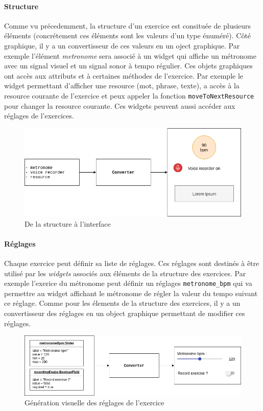 \paragraph{Structure}
Comme vu précedemment, la structure d'un exercice est consituée de plusieurs éléments (concrétement ces éléments sont les valeurs d'un type énuméré). Côté graphique, il y a un convertisseur de ces valeurs en un oject graphique. Par exemple l'élément \textit{metronome} sera associé à un widget qui affiche un métronome avec un signal visuel et un signal sonor à tempo régulier. Ces objets graphiques ont accès aux attributs et à certaines méthodes de l'exercice. Par exemple le widget permettant d'afficher une resource (mot, phrase, texte), a accès à la resource courante de l'exercice et peux appeler la fonction \texttt{moveToNextResource} pour changer la resource courante. Ces widgets peuvent aussi accéder aux réglages de l'exercices.

\begin{figure}[H]
  \includegraphics[width=0.8\linewidth]{content/imgs/struc.png}
  \caption{De la structure à l'interface}
  \label{fig:struc}
\end{figure}

\paragraph{Réglages}
Chaque exercice peut définir sa liste de réglages. Ces réglages sont destinés à être utilisé par les \textit{widgets} associés aux éléments de la structure des exercices. Par exemple l'exerice du métronome peut définir un réglages \texttt{metronome\_bpm} qui va permettre au widget affichant le métronome de régler la valeur du tempo suivant ce réglage. Comme pour les élements de la structure des exercices, il y a un convertisseur des réglages en un object graphique permettant de modifier ces réglages.

\begin{figure}[H]
  \includegraphics[width=0.8\linewidth]{content/imgs/settings.png}
  \caption{Génération visuelle des réglages de l'exercice}
  \label{fig:settings}
\end{figure}

